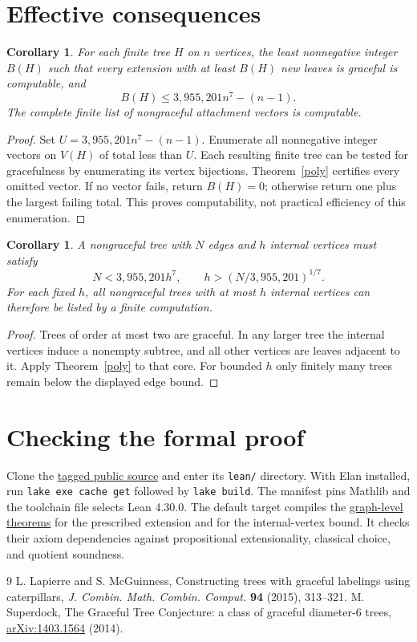 \documentclass[11pt]{article}
\newtheorem{corollary}[theorem]{Corollary}
\newcommand{\proofmodule}[2]{\href{https://github.com/Aky-lab/graceful-leaf-threshold-preprint/blob/v1.2/lean/Next/#1.lean}{#2}}
\begin{document}
\section{Effective consequences}
\begin{corollary}\label{effective}
For each finite tree $H$ on $n$ vertices, the least nonnegative integer
$B(H)$ such that every extension with at least $B(H)$ new leaves is
graceful is computable, and
\[
 B(H)\le 3{,}955{,}201n^7-(n-1).
\]
The complete finite list of nongraceful attachment vectors is computable.
\end{corollary}
\begin{proof}
Set $U=3{,}955{,}201n^7-(n-1)$. Enumerate all nonnegative integer
vectors on $V(H)$ of total less than $U$. Each resulting finite tree
can be tested for gracefulness by enumerating its vertex bijections.
Theorem~\ref{poly} certifies every omitted vector. If no vector fails,
return $B(H)=0$; otherwise return one plus the largest failing total.
This proves computability, not practical efficiency of this enumeration.
\end{proof}
\begin{samepage}
\begin{corollary}\label{internalorder}
A nongraceful tree with $N$ edges and $h$ internal vertices must satisfy
\[
 N<3{,}955{,}201h^7,\qquad
 h>(N/3{,}955{,}201)^{1/7}.
\]
For each fixed $h$, all nongraceful trees with at most $h$ internal
vertices can therefore be listed by a finite computation.
\end{corollary}
\begin{proof}
Trees of order at most two are graceful. In any larger tree the internal
vertices induce a nonempty subtree, and all other vertices are leaves
adjacent to it. Apply Theorem~\ref{poly} to that core. For bounded $h$
only finitely many trees remain below the displayed edge bound.
\end{proof}
\end{samepage}

\section*{Checking the formal proof}
Clone the \href{https://github.com/Aky-lab/graceful-leaf-threshold-preprint/tree/v1.2}{tagged public source}
and enter its \texttt{lean/} directory. With Elan installed, run
\texttt{lake exe cache get} followed by \texttt{lake build}.
The manifest pins Mathlib and the toolchain file selects Lean 4.30.0.
The default target compiles the \proofmodule{TreeEncodingPolynomialParityPacket}{graph-level theorems}
for the prescribed extension and for the internal-vertex bound.
It checks their axiom dependencies against propositional extensionality,
classical choice, and quotient soundness.
\small\begin{thebibliography}{9}
 L. Lapierre and S. McGuinness, Constructing trees with graceful labelings using caterpillars, \emph{J. Combin. Math. Combin. Comput.} \textbf{94} (2015), 313--321.
 M. Superdock, The Graceful Tree Conjecture: a class of graceful diameter-6 trees, \href{https://arxiv.org/abs/1403.1564}{arXiv:1403.1564} (2014).
\end{thebibliography}
\end{document}
